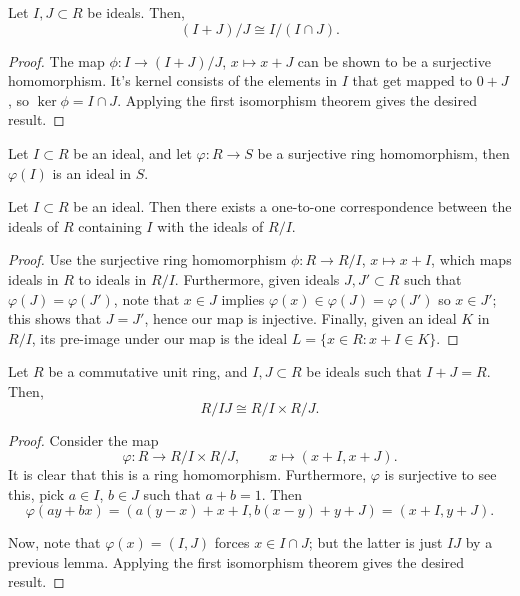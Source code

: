 \documentclass[11pt]{article}
\theoremstyle{definition}
\theoremstyle{remark}
\numberwithin{equation}{section}
\begin{document}
    \begin{theorem}
        Let $I, J \subset R$ be ideals. Then, \[
            (I + J)/J \cong I/(I \cap J).
        \] 
    \end{theorem}
    \begin{proof}
        The map $\phi\colon I \to (I + J)/J$, $x \mapsto x + J$ can be shown to be a
        surjective homomorphism. It's kernel consists of the elements in $I$ that get
        mapped to $0 + J$, so $\ker{\phi} = I \cap J$. Applying the first isomorphism
        theorem gives the desired result.
    \end{proof}

    \begin{lemma}
        Let $I \subset R$ be an ideal, and let $\varphi\colon R \to S$ be a
        surjective ring homomorphism, then $\varphi(I)$ is an ideal in $S$.
    \end{lemma}

    \begin{theorem}
        Let $I \subset R$ be an ideal. Then there exists a one-to-one correspondence
        between the ideals of $R$ containing $I$ with the ideals of $R/I$.
    \end{theorem}
    \begin{proof}
        Use the surjective ring homomorphism $\phi\colon R \to R/I$, $x \mapsto x +
        I$, which maps ideals in $R$ to ideals in $R/I$. Furthermore, given ideals
        $J, J' \subset R$ such that $\varphi(J) = \varphi(J')$, note that $x \in J$
        implies $\varphi(x) \in \varphi(J) = \varphi(J')$ so $x \in J'$; this shows
        that $J = J'$, hence our map is injective. Finally, given an ideal $K$ in
        $R/I$, its pre-image under our map is the ideal $L = \{x \in R: x + I \in
        K\}$.
    \end{proof}


    \begin{theorem}
        Let $R$ be a commutative unit ring, and $I, J \subset R$ be ideals such that
        $I + J = R$. Then, \[
            R / IJ \cong R/I \times R/J.
        \] 
    \end{theorem}
    \begin{proof}
        Consider the map \[
            \varphi\colon R \to R/I \times R/J, \qquad x \mapsto (x + I, x + J).
        \] It is clear that this is a ring homomorphism. Furthermore, $\varphi$ is
        surjective to see this, pick $a \in I$, $b \in J$ such that $a + b = 1$.
        Then \[
            \varphi(ay + bx) = (a(y - x) + x + I, b(x - y) + y + J) = (x + I, y + J).
        \] 

        Now, note that $\varphi(x) = (I, J)$ forces $x \in I \cap J$; but the latter
        is just $IJ$ by a previous lemma. Applying the first isomorphism theorem
        gives the desired result.
    \end{proof}
\end{document}
